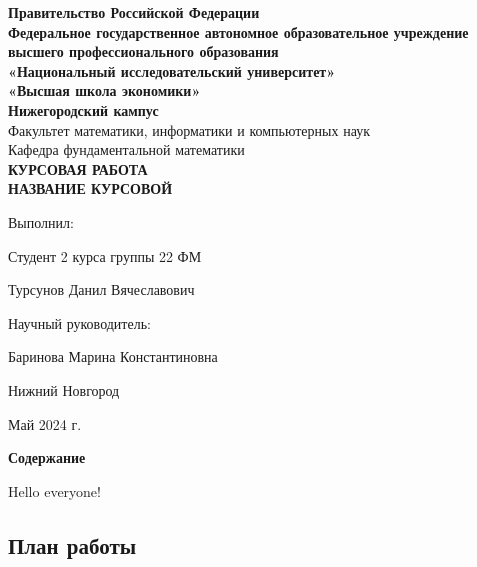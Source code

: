


	\setcounter{page}{1}
	
	\begin{center} 
		\textbf{Правительство Российской Федерации}
		\\ \textbf{Федеральное государственное автономное образовательное учреждение}
		\\ \textbf{высшего профессионального образования}
		\\ \textbf{«Национальный исследовательский университет»}
		\\ \textbf{«Высшая школа экономики»}
		\\ \textbf{Нижегородский кампус}
		\vspace{3cm}
		\\ Факультет математики, информатики и компьютерных наук
		\\ Кафедра фундаментальной математики
		\vspace{3cm}
		\\ \large\textbf{КУРСОВАЯ РАБОТА}
		\vspace{0.3cm}
		\\ \large\textbf{НАЗВАНИЕ КУРСОВОЙ}
	\end{center}
	
	\vspace{3cm}\hspace{8cm} Выполнил: 
	\par \hspace{8cm} Студент 2 курса группы 22 ФМ 
	\par \hspace{8cm} Турсунов Данил Вячеславович
	\par \vspace{0.8cm} \hspace{8cm} Научный руководитель:
	\par \hspace{8cm} Баринова Марина Константиновна
	\begin{center} 
		\vspace{4cm} Нижний Новгород
		\par Май 2024 г.
	\end{center}
	
	\newpage
	\begin{center}
		\LARGE\textbf{Содержание}
	\end{center}
	\newpage

	\textsf{Hello everyone!}
	\subsection*{План работы}
